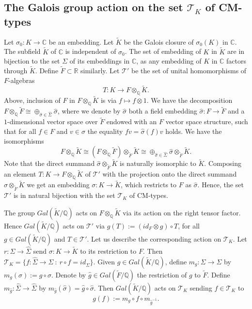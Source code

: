 \documentclass[12pt]{amsart}
\numberwithin{equation}{subsection}
\theoremstyle{plain}
\theoremstyle{definition}
\newcommand{\CC}{{\mathbb C}}
\newcommand{\QQ}{{\mathbb Q}}
\newcommand{\RR}{{\mathbb R}}
\newcommand{\T}{{\mathcal T}}
\begin{document}
{\subsection{The Galois group action on the set $\T_K$ of CM-types}
\label{sec-Galois-action-on-set-of-CM-types}
Let $\sigma_0:K\rightarrow\CC$ be an embedding. Let $\tilde{K}$ be the Galois closure of $\sigma_0(K)$ in $\CC$. The subfield $\tilde{K}$ of $\CC$ is independent of $\sigma_0$. The set of embedding of $K$ in $\tilde{K}$ are in bijection to the set $\Sigma$ of its embeddings in $\CC$, as any embedding of $K$ in $\CC$ factors through $\tilde{K}$. Define $\tilde{F}\subset \RR$ similarly. Let $\T'$ be the set of unital homomorphisms of $F$-algebras
\[
T:K\rightarrow F\otimes_\QQ\tilde{K}.
\]
Above, inclusion of $F$ in $F\otimes_\QQ\tilde{K}$ is via $f\mapsto f\otimes 1$. 
We have the decomposition $F\otimes_\QQ\tilde{F}\cong \oplus_{\hat{\sigma}\in\hat{\Sigma}}\hat{\sigma}$, where we denote by $\hat{\sigma}$ both a field embedding $\hat{\sigma}:F\rightarrow \tilde{F}$ and a $1$-dimensional  vector space over $\tilde{F}$ endowed with an $F$ vector space structure, such that for all $f\in F$ and $v\in \hat{\sigma}$ the equality $fv=\hat{\sigma}(f)v$ holds.
We have the isomorphisms
\[
F\otimes_\QQ\tilde{K}\cong
(F\otimes_\QQ\tilde{F})\otimes_{\tilde{F}}\tilde{K}\cong
\oplus_{\hat{\sigma}\in\hat{\Sigma}}\hat{\sigma}\otimes_{\tilde{F}}\tilde{K}.
\]
Note that the direct summand $\hat{\sigma}\otimes_{\tilde{F}}\tilde{K}$ is naturally isomorphic to $\tilde{K}$.
Composing an element $T:K\rightarrow F\otimes_\QQ\tilde{K}$ of $\T'$ with the projection onto the direct summand $\hat{\sigma}\otimes_{\tilde{F}}\tilde{K}$ we get an embedding $\sigma:K\rightarrow \tilde{K}$, which restricts to $F$ as $\hat{\sigma}$. Hence, the set $\T'$ is in natural bijection with the set $\T_K$ of CM-types.

The group $Gal(\tilde{K}/\QQ)$ acts on $F\otimes_\QQ\tilde{K}$ via its action on the right tensor factor. Hence $Gal(\tilde{K}/\QQ)$ acts on $\T'$ via 
$g(T):=(id_F\otimes g)\circ T$, for all $g\in Gal(\tilde{K}/\QQ)$ and $T\in \T'$. Let us describe the corresponding action on $\T_K$.
Let $r:\Sigma\rightarrow \hat{\Sigma}$ send $\sigma:K\rightarrow \tilde{K}$ to its restriction to $F$.
Then $\T_K=\{f:\hat{\Sigma}\rightarrow \Sigma \ : \ r\circ f=id_{\hat{\Sigma}}\}$. Given $g\in Gal(\tilde{K}/\QQ)$, define $m_g:\Sigma\rightarrow\Sigma$ 
by $m_g(\sigma):=g\circ\sigma$. Denote by $\hat{g}\in Gal(\tilde{F}/\QQ)$ the restriction of $g$ to $\tilde{F}$. Define
$m_{\hat{g}}:\hat{\Sigma}\rightarrow\hat{\Sigma}$ by $m_{\hat{g}}(\hat{\sigma})=\hat{g}\circ\hat{\sigma}$. Then $Gal(\tilde{K}/\QQ)$ acts on $\T_K$ sending
$f\in \T_K$ to
\[
g(f) := m_g\circ f\circ m_{\hat{g}^{-1}}.
\]

}
\end{document}
